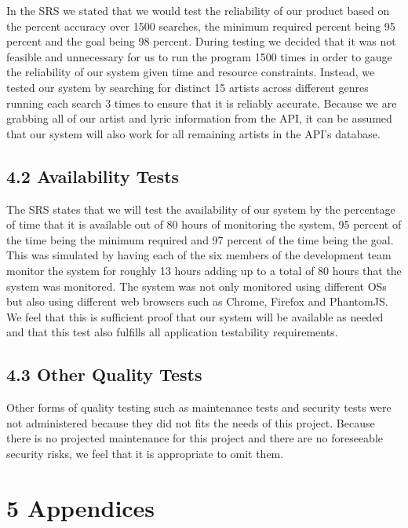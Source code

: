 \documentclass[]{article}
\begin{document}
In the SRS we stated that we would test the reliability of our product
based on the percent accuracy over 1500 searches, the minimum required
percent being 95 percent and the goal being 98 percent. During testing
we decided that it was not feasible and unnecessary for us to run the
program 1500 times in order to gauge the reliability of our system given
time and resource constraints. Instead, we tested our system by
searching for distinct 15 artists across different genres running each
search 3 times to ensure that it is reliably accurate. Because we are
grabbing all of our artist and lyric information from the API, it can be
assumed that our system will also work for all remaining artists in the
API's database.

\subsection{\textbf{4.2 Availability Tests}}\label{availability-tests}

The SRS states that we will test the availability of our system by the
percentage of time that it is available out of 80 hours of monitoring
the system, 95 percent of the time being the minimum required and 97
percent of the time being the goal. This was simulated by having each of
the six members of the development team monitor the system for roughly
13 hours adding up to a total of 80 hours that the system was monitored.
The system was not only monitored using different OSs but also using
different web browsers such as Chrome, Firefox and PhantomJS. We feel
that this is sufficient proof that our system will be available as
needed and that this test also fulfills all application testability
requirements.

\subsection{\textbf{4.3 Other Quality Tests}}\label{other-quality-tests}

Other forms of quality testing such as maintenance tests and security
tests were not administered because they did not fits the needs of this
project. Because there is no projected maintenance for this project and
there are no foreseeable security risks, we feel that it is appropriate
to omit them.

\section{\textbf{5 Appendices }}\label{appendices}
\end{document}
